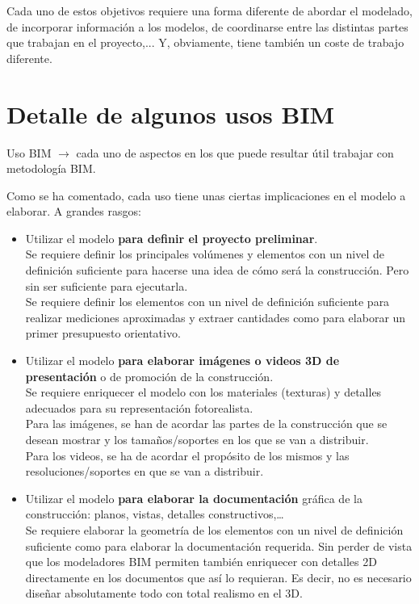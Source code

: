 \documentclass[spanish,12pt,a4paper,final,oneside]{book}
\begin{document}
Cada uno de estos objetivos requiere una forma diferente de abordar el modelado, de incorporar información a los modelos, de coordinarse entre las distintas partes que trabajan en el proyecto,... Y, obviamente, tiene también un coste de trabajo diferente.


\section{Detalle de algunos usos BIM}
Uso BIM $\rightarrow$ cada uno de aspectos en los que puede resultar útil trabajar con metodología BIM.

Como se ha comentado, cada uso tiene unas ciertas implicaciones en el modelo a elaborar. A grandes rasgos:

\begin{itemize}

\item Utilizar el modelo \textbf{para definir el proyecto preliminar}.
\\Se requiere definir los principales volúmenes y elementos con un nivel de definición suficiente para hacerse una idea de cómo será la construcción. Pero sin ser suficiente para ejecutarla.
\\Se requiere definir los elementos con un nivel de definición suficiente para realizar mediciones aproximadas y extraer cantidades como para elaborar un primer presupuesto orientativo.

\item Utilizar el modelo \textbf{para elaborar imágenes o videos 3D de presentación} o de promoción de la construcción.
\\Se requiere enriquecer el modelo con los materiales (texturas) y detalles adecuados para su representación fotorealista.
\\Para las imágenes, se han de acordar las partes de la construcción que se desean mostrar y los tamaños/soportes en los que se van a distribuir.
\\Para los videos, se ha de acordar el propósito de los mismos y las resoluciones/soportes en que se van a distribuir.

\item Utilizar el modelo \textbf{para elaborar la documentación} gráfica de la construcción: planos, vistas, detalles constructivos,\ldots 
\\Se requiere elaborar la geometría de los elementos con un nivel de definición suficiente como para elaborar la documentación requerida. Sin perder de vista que los modeladores BIM  permiten también enriquecer con detalles 2D directamente en los documentos que así lo requieran. Es decir, no es necesario diseñar absolutamente todo con total realismo en el 3D.


\end{itemize}
\end{document}
